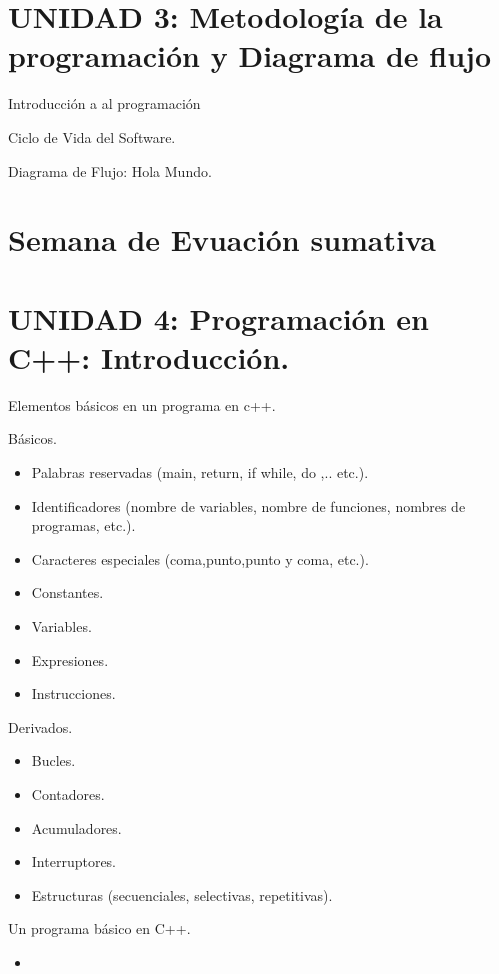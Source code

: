\documentclass[presentation, aspectratio=54]{beamer}
\begin{document}
\section{UNIDAD 3: Metodología de la programación y Diagrama de flujo}
\label{sec:orge7432b9}
\begin{frame}[label={sec:orgc6f9911}]{Introducción a al programación}
\end{frame}
\begin{frame}[label={sec:orga12c989}]{Ciclo de Vida del Software.}
\end{frame}
\begin{frame}[label={sec:org294e302}]{Diagrama de Flujo: Hola Mundo.}
\end{frame}
\section{Semana de Evuación sumativa}
\label{sec:org8705eb1}
\section{UNIDAD 4: Programación en C++: Introducción.}
\label{sec:org7183623}
\begin{frame}[label={sec:orgfa188f0}]{Elementos básicos en un programa en c++.}
\begin{block}{Básicos.}
\begin{itemize}
\item Palabras reservadas (main, return, if while, do ,.. etc.).
\item Identificadores (nombre de variables, nombre de funciones, nombres de programas, etc.).
\item Caracteres especiales (coma,punto,punto y coma, etc.).
\item Constantes.
\item Variables.
\item Expresiones.
\item Instrucciones.
\end{itemize}
\end{block}
\begin{block}{Derivados.}
\begin{itemize}
\item Bucles.
\item Contadores.
\item Acumuladores.
\item Interruptores.
\item Estructuras (secuenciales, selectivas, repetitivas).
\end{itemize}
\end{block}
\end{frame}
\begin{frame}[label={sec:org71eb7cf}]{Un programa básico en C++.}
\begin{itemize}
\item 
\end{itemize}
\end{frame}
\end{document}

